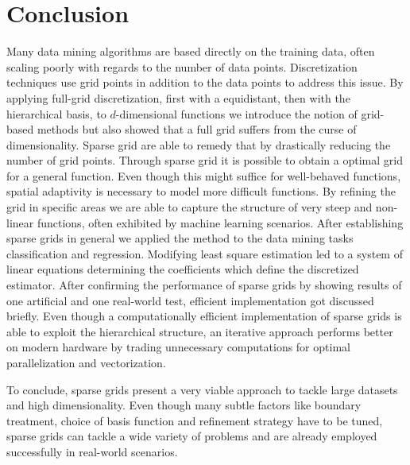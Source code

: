 \section{Conclusion}
Many data mining algorithms are based directly on the training data, often
scaling poorly with regards to the number of data points.
Discretization techniques use grid points in addition to the data
points to address this issue. By applying full-grid discretization, first
with a equidistant, then with the hierarchical basis,
to $d$-dimensional functions we introduce the
notion of grid-based methods but also showed that a full grid suffers from
the curse of dimensionality.
Sparse grid are able to remedy that by drastically reducing the number of
grid points. Through sparse grid it is possible to obtain a optimal grid
for a general function. Even though this might suffice for well-behaved functions,
spatial adaptivity is necessary to model more difficult functions. By refining
the grid in specific areas we are able to capture the structure of very steep
and non-linear functions, often exhibited by machine learning scenarios.
After establishing sparse grids in general we applied the method to
the data mining tasks classification and regression. Modifying least square
estimation led to a system of linear equations determining the
coefficients which define the discretized estimator. After confirming the
performance of sparse grids by showing
results of one artificial and one real-world test, efficient
implementation got discussed briefly. Even though a computationally
efficient implementation of sparse grids is able to exploit the hierarchical
structure, an iterative approach performs better on modern hardware by
trading unnecessary computations for
optimal parallelization and vectorization.
\par
To conclude, sparse grids present a very viable approach to tackle large
datasets and high dimensionality. Even though many subtle factors like
boundary treatment, choice of basis function and refinement strategy have to be
tuned, sparse grids can tackle a wide variety of problems and are already
employed successfully in real-world scenarios.

